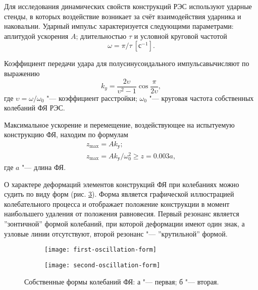 Для исследования динамических свойств конструкций РЭС используют ударные стенды, в которых воздействие возникает за счёт взаимодействия ударника и наковальни.
Ударный импульс характеризуется следующими параметрами: аплитудой ускорения $A$; длительностью $\tau$ и условной круговой частотой
\begin{equation}\label{eq:angular-frequency}
    \omega = \pi / \tau~[с^{-1}].
\end{equation}

Коэффициент передачи удара для полусинусоидального импульсавычисляют по выражению
\begin{equation}
    k_{y} = \frac{2 \upsilon}{\upsilon^2 - 1} \cos \frac{\pi}{2 \upsilon},
\end{equation}
где $\upsilon = \omega / \omega_0$ "--- коэффициент расстройки; $\omega_0$ "--- круговая частота собственных колебаний ФЯ РЭС.

Максимальное ускорение и перемещение, воздействующее на испытуемую конструкцию ФЯ, находим по формулам
\begin{align}
    z_{\max} = A k_{у}; \\
    z_{\max} = A k_{у} / \omega_0^2 \ge z = 0.003 a, \label{eq:max-displacement}
\end{align}
где $a$ "--- длина ФЯ.

О характере деформаций элементов конструкций ФЯ при колебаниях можно судить по виду форм (рис. \ref{fig:oscillation-forms}).
Форма является графической иллюстрацией колебательного процесса и отображает положение конструкции в момент наибольшего удаления от положения равновесия.
Первый резонанс является ''зонтичной'' формой колебаний, при которой деформации имеют один знак, а узловые линии отсутствуют, второй резонанс "--- ''крутильной'' формой.
\begin{figure}[H]
    \centering
    \begin{subfigure}[b]{0.45\textwidth}
        \centering
        \texttt{[image: first-oscillation-form]}
        \caption{}
        \label{fig:first-oscillation-form}
    \end{subfigure}
    \hfill
    \begin{subfigure}[b]{0.45\textwidth}
        \centering
        \texttt{[image: second-oscillation-form]}
        \caption{}
        \label{fig:second-oscillation-form}
    \end{subfigure}
    \caption{Собственные формы колебаний ФЯ:
        а "--- первая;
        б "--- вторая.
    }
    \label{fig:oscillation-forms}
\end{figure}

